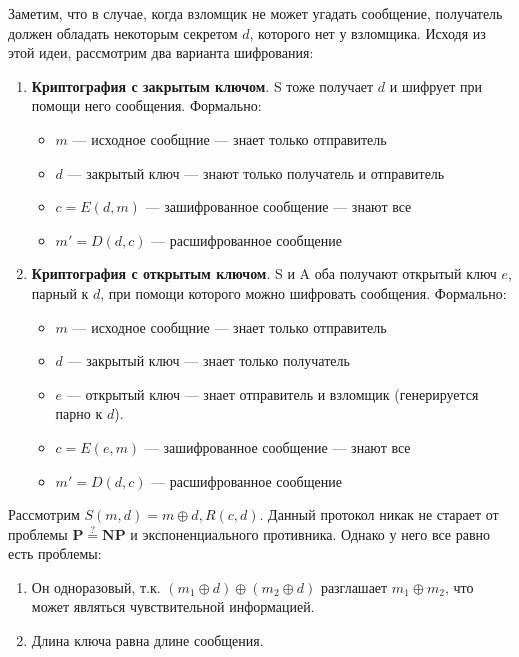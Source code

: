 Заметим, что в случае, когда взломщик не может угадать сообщение, получатель должен обладать некоторым секретом \(d\), которого нет у взломщика. Исходя из этой идеи, рассмотрим два варианта шифрования:


\begin{enumerate}
    \item \textbf{Криптография с закрытым ключом}. S тоже получает \(d\) и шифрует при помощи него сообщения. Формально:
    \begin{itemize}
        \item \(m\) --- исходное сообщние --- знает только отправитель
        \item \(d\) --- закрытый ключ --- знают только получатель и отправитель
        \item \(c = E(d, m)\) --- зашифрованное сообщение --- знают все
        \item \(m' = D(d, c)\) --- расшифрованное сообщение
    \end{itemize}
    \item \textbf{Криптография с открытым ключом}. S и A оба получают открытый ключ \(e\), парный к \(d\), при помощи которого можно шифровать сообщения. Формально:
    \begin{itemize}
        \item \(m\) --- исходное сообщние --- знает только отправитель
        \item \(d\) --- закрытый ключ --- знает только получатель
        \item \(e\) --- открытый ключ --- знает отправитель и взломщик (генерируется парно к \(d\)).
        \item \(c = E(e, m)\) --- зашифрованное сообщение --- знают все
        \item \(m' = D(d, c)\) --- расшифрованное сообщение
    \end{itemize}
\end{enumerate}

\begin{reminder}[Гаммирование]
    Рассмотрим \(S(m, d) = m \oplus d, R(c, d)\). Данный протокол никак не старает от проблемы \(\mathbf{P} \stackrel{?}{=} \mathbf{NP}\) и экспоненциального противника. Однако у него все равно есть проблемы:
    \begin{enumerate}
        \item Он одноразовый, т.к. \((m_1 \oplus d) \oplus (m_2 \oplus d)\) разглашает \(m_1 \oplus m_2\), что может являться чувствительной информацией.
        \item Длина ключа равна длине сообщения.
    \end{enumerate}
\end{reminder}

